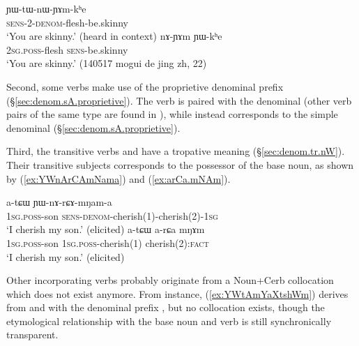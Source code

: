 \begin{exe}
\ex 
\begin{xlist}
\ex \label{ex:YWtWnWYAmkhe}
\gll ɲɯ-tɯ-nɯ-ɲɤm-kʰe \\
\textsc{sens}-2-\textsc{denom}-flesh-be.skinny \\
\glt `You are skinny.' (heard in context)
\ex \label{ex:nAYAm.YWkhe}
\gll  nɤ-ɲɤm ɲɯ-kʰe \\
\textsc{2sg}.\textsc{poss}-flesh \textsc{sens}-be.skinny \\
\glt `You are skinny.' (140517 mogui de jing zh, 22)
\end{xlist}
\end{exe}

 

Second, some verbs make use of the   proprietive denominal prefix (§\ref{sec:denom.sA.proprietive}). The verb  is paired with the  denominal  (other verb pairs of the same type are found in ), while  instead corresponds to the simple denominal  (§\ref{sec:denom.sA.proprietive}).

Third, the transitive verbs   and  have a tropative meaning (§\ref{sec:denom.tr.nW}). Their transitive subjects corresponds to the possessor of the base noun, as shown by (\ref{ex:YWnArCAmNama}) and (\ref{ex:arCa.mNAm}).

\begin{exe}
\ex 
\begin{xlist}
\ex \label{ex:YWnArCAmNama}
\gll a-tɕɯ ɲɯ-nɤ-rɕɤ-mŋam-a \\
\textsc{1sg}.\textsc{poss}-son \textsc{sens}-\textsc{denom}-cherish(1)-cherish(2)-\textsc{1sg} \\
\glt `I cherish my son.' (elicited)
\ex \label{ex:arCa.mNAm}
\gll  a-tɕɯ a-rɕa mŋɤm \\
\textsc{1sg}.\textsc{poss}-son  \textsc{1sg}.\textsc{poss}-cherish(1)  cherish(2):\textsc{fact}   \\
\glt `I cherish my son.' (elicited)
\end{xlist}
\end{exe}

Other incorporating verbs probably originate from a Noun+Cerb collocation which does not exist anymore. From instance,  (\ref{ex:YWtAmYaXtshWm}) derives from  and  with the denominal prefix , but no collocation  exists, though the etymological relationship with the base noun and verb is still synchronically transparent.


